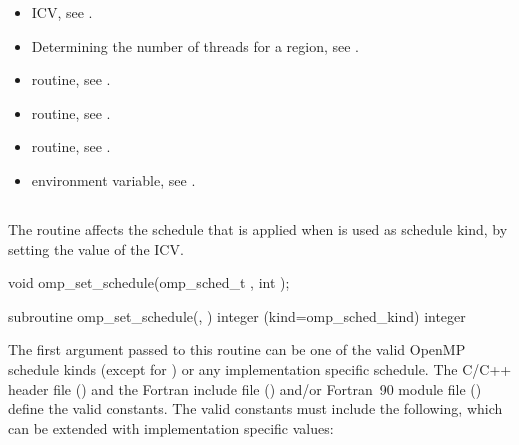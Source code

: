 \crossreferences
\begin{itemize}
\item {} ICV, see
.

\item Determining the number of threads for a  region, see
.

\item {} routine, see
.

\item {} routine, see
.

\item {} routine, see
.

\item {} environment variable, see
.
\end{itemize}



\subsection{}
\label{subsec:omp_set_schedule}
\summary
The  routine affects the schedule that is applied 
when  is used as schedule kind, by setting the value of the 
 ICV.

\format
\begin{ccppspecific}
\begin{ompcFunction}
void omp_set_schedule(omp_sched_t , int );
\end{ompcFunction}
\end{ccppspecific}

\begin{fortranspecific}
\begin{ompfSubroutine}
subroutine omp_set_schedule(, )
integer (kind=omp_sched_kind) 
integer 
\end{ompfSubroutine}
\end{fortranspecific}

\constraints
The first argument passed to this routine can be one of the valid OpenMP 
schedule kinds (except for ) or any implementation specific 
schedule. The C/C++ header file () and the Fortran include file 
() and/or Fortran~90 module file 
() define the valid constants. The valid constants must 
include the following, which can be extended with implementation specific values:

